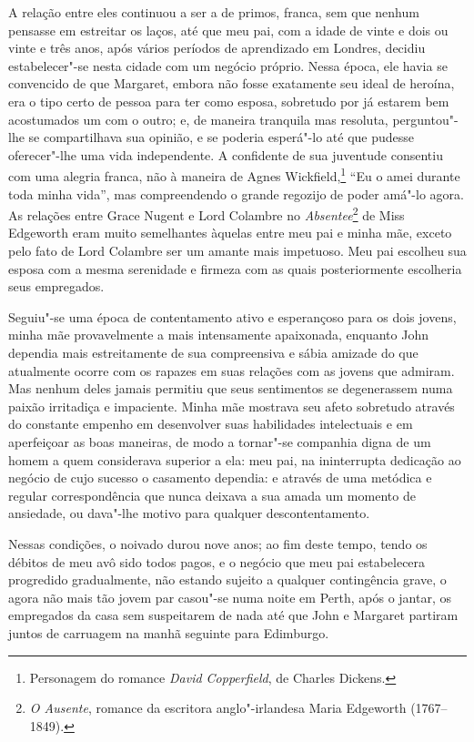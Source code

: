A relação entre eles continuou a ser a de primos, franca, sem que nenhum
pensasse em estreitar os laços, até que meu pai, com a idade de vinte e
dois ou vinte e três anos, após vários períodos de aprendizado em
Londres, decidiu estabelecer"-se nesta cidade com um negócio próprio.
Nessa época, ele havia se convencido de que Margaret, embora não fosse
exatamente seu ideal de heroína, era o tipo certo de pessoa para ter
como esposa, sobretudo por já estarem bem acostumados um com o outro; e,
de maneira tranquila mas resoluta, perguntou"-lhe se compartilhava sua
opinião, e se poderia esperá"-lo até que pudesse oferecer"-lhe uma vida
independente. A confidente de sua juventude consentiu com uma alegria
franca, não à maneira de Agnes Wickfield,\footnote{Personagem do romance
  \textit{David Copperfield}, de Charles Dickens.} ``Eu o
amei durante toda minha vida'', mas compreendendo o grande regozijo de
poder amá"-lo agora. As relações entre Grace Nugent e Lord Colambre no
\textit{Absentee}\footnote{\textit{O Ausente}, romance da escritora
  anglo"-irlandesa Maria Edgeworth (1767--1849).} de Miss
Edgeworth eram muito semelhantes àquelas entre meu pai e minha mãe,
exceto pelo fato de Lord Colambre ser um amante mais impetuoso. Meu pai
escolheu sua esposa com a mesma serenidade e firmeza com as quais
posteriormente escolheria seus empregados.

Seguiu"-se uma época de contentamento ativo e esperançoso para os
dois jovens, minha mãe provavelmente a mais intensamente apaixonada,
enquanto John dependia mais estreitamente de sua compreensiva e sábia
amizade do que atualmente ocorre com os rapazes em suas relações com as
jovens que admiram. Mas nenhum deles jamais permitiu que seus
sentimentos se degenerassem numa paixão irritadiça e impaciente. Minha
mãe mostrava seu afeto sobretudo através do constante empenho em
desenvolver suas habilidades intelectuais e em aperfeiçoar as boas
maneiras, de modo a tornar"-se companhia digna de um homem a quem
considerava superior a ela: meu pai, na ininterrupta dedicação ao
negócio de cujo sucesso o casamento dependia: e através de uma metódica
e regular correspondência que nunca deixava a sua amada um momento de
ansiedade, ou dava"-lhe motivo para qualquer descontentamento.

Nessas condições, o noivado durou nove anos; ao fim deste tempo, tendo
os débitos de meu avô sido todos pagos, e o negócio que meu pai
estabelecera progredido gradualmente, não estando sujeito a qualquer
contingência grave, o agora não mais tão jovem par casou"-se numa noite
em Perth, após o jantar, os empregados da casa sem suspeitarem de nada
até que John e Margaret partiram juntos de carruagem na manhã seguinte
para Edimburgo.

